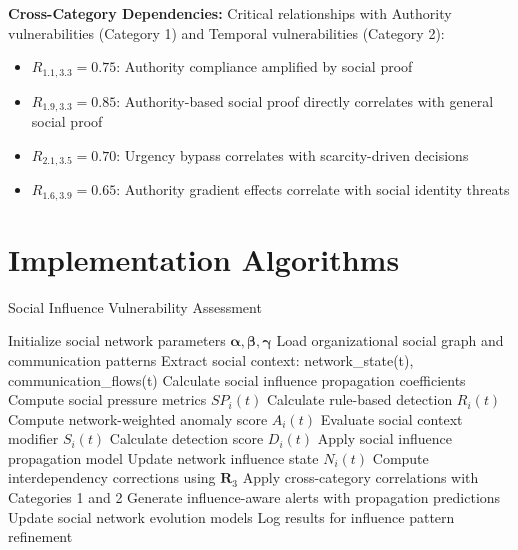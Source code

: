 \documentclass[11pt,a4paper]{article}
\begin{document}
\textbf{Cross-Category Dependencies:}
Critical relationships with Authority vulnerabilities (Category 1) and Temporal vulnerabilities (Category 2):
\begin{itemize}
\item $R_{1.1,3.3} = 0.75$: Authority compliance amplified by social proof
\item $R_{1.9,3.3} = 0.85$: Authority-based social proof directly correlates with general social proof
\item $R_{2.1,3.5} = 0.70$: Urgency bypass correlates with scarcity-driven decisions
\item $R_{1.6,3.9} = 0.65$: Authority gradient effects correlate with social identity threats
\end{itemize}

\section{Implementation Algorithms}

\begin{algorithm}
\caption{Social Influence Vulnerability Assessment}
\begin{algorithmic}[1]
\STATE Initialize social network parameters $\boldsymbol{\alpha}, \boldsymbol{\beta}, \boldsymbol{\gamma}$
\STATE Load organizational social graph and communication patterns
    \STATE Extract social context: network\_state(t), communication\_flows(t)
    \STATE Calculate social influence propagation coefficients
        \STATE Compute social pressure metrics $SP_i(t)$
        \STATE Calculate rule-based detection $R_i(t)$
        \STATE Compute network-weighted anomaly score $A_i(t)$
        \STATE Evaluate social context modifier $S_i(t)$
        \STATE Calculate detection score $D_i(t)$
        \STATE Apply social influence propagation model
        \STATE Update network influence state $N_i(t)$
    \ENDFOR
    \STATE Compute interdependency corrections using $\mathbf{R}_3$
    \STATE Apply cross-category correlations with Categories 1 and 2
    \STATE Generate influence-aware alerts with propagation predictions
    \STATE Update social network evolution models
    \STATE Log results for influence pattern refinement
\ENDFOR
\end{algorithmic}
\end{algorithm}
\end{document}
